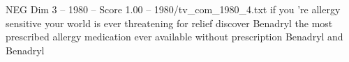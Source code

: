 \begin{textsample}{NEG Dim 3 – 1980 – Score 1.00 – 1980/tv\_com\_1980\_4.txt}  \label{ex:f3_neg_045}
if you 're allergy sensitive your world is ever threatening for relief discover Benadryl the most prescribed allergy medication ever available without prescription Benadryl and Benadryl

\end{textsample}
